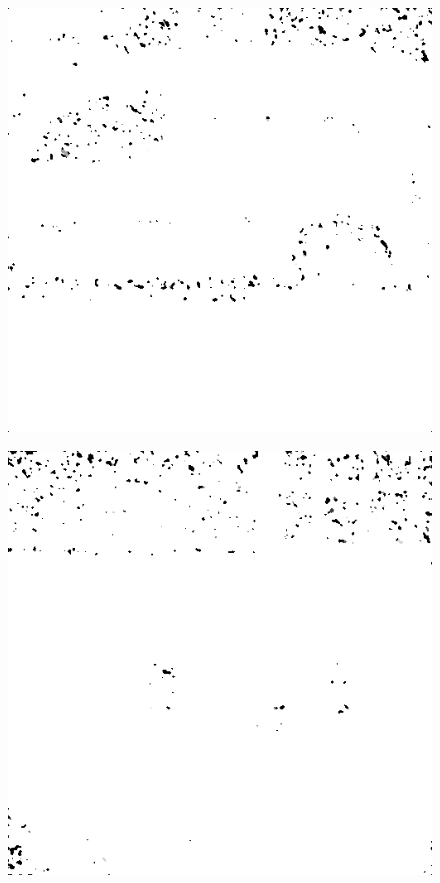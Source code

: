 \begin{figure}[H]
\begin{minipage}[t]{0.3\linewidth}
	\subcaption{}
	\label{fig:sit_m20}
\end{minipage}
\begin{minipage}[t]{0.3\linewidth} %
	\includegraphics[width = 1\linewidth]{gfx/car/car_m25.png}
	\label{fig:car_m25}
\end{minipage}
\begin{minipage}[t]{0.3\linewidth} %
	\includegraphics[width = 1\linewidth]{gfx/hus/hus_m25.png}

\end{minipage}
\end{figure}
